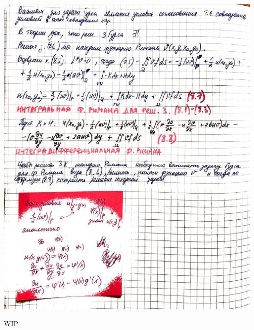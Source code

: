 \documentclass[../main.tex]{subfiles}
\begin{document}
\includegraphics[scale=0.7]{Liza_2.7.4.jpg}
\includegraphics[scale=0.7]{Liza_2.7.5.jpg}

WIP
\end{document}
